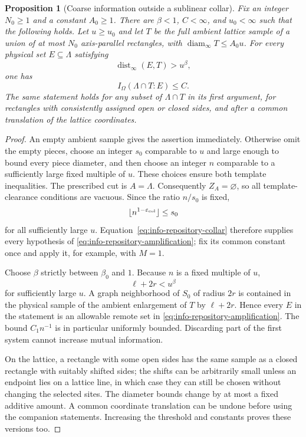 \documentclass[11pt]{article}
\numberwithin{equation}{section}
\newtheorem{proposition}[theorem]{Proposition}
\theoremstyle{definition}
\theoremstyle{remark}
\begin{document}
\begin{proposition}[Coarse information outside a sublinear collar]
\label{prop:coarse}
Fix an integer $N_0\ge1$ and a constant $A_0\ge1$.  There are
$\beta<1$, $C<\infty$, and $u_0<\infty$ such that the following holds.
Let $u\ge u_0$ and let $T$ be the full ambient lattice sample of a union
of at most $N_0$ axis-parallel rectangles, with
$\operatorname{diam}_\infty T\le A_0u$.  For every physical set $E\subseteq\Lambda$
satisfying
\[
 \operatorname{dist}_\infty(E,T)>u^\beta,
\]
one has
\[
 I_\Omega(\Lambda\cap T:E)\le C.
\]
The same statement holds for any subset of $\Lambda\cap T$ in its first
argument, for rectangles with consistently assigned open or closed
sides, and after a common translation of the lattice coordinates.
\end{proposition}

\begin{proof}
An empty ambient sample gives the assertion immediately.  Otherwise
omit the empty pieces, choose an integer $s_0$ comparable to $u$ and
large enough to bound every piece diameter, and then choose an integer
$n$ comparable to a sufficiently large fixed multiple of $u$.  These
choices ensure both template inequalities.  The prescribed cut is
$A=\Lambda$.  Consequently $Z_A=\varnothing$, so all template-clearance
conditions are vacuous.  Since the ratio $n/s_0$ is fixed,
\[
 \lfloor n^{1-\varepsilon_{\rm col}}\rfloor\le s_0
\]
for all sufficiently large $u$.  Equation~\eqref{eq:info-repository-collar}
therefore supplies every hypothesis of
\eqref{eq:info-repository-amplification}; fix its common constant once
and apply it, for example, with $M=1$.

Choose $\beta$ strictly between $\beta_0$ and $1$.  Because $n$ is a
fixed multiple of $u$,
\[
 \ell+2r<u^\beta
\]
for sufficiently large $u$.  A graph neighborhood of $S_0$ of radius
$2r$ is contained in the physical sample of the ambient enlargement of
$T$ by $\ell+2r$.  Hence every $E$ in the statement is an allowable
remote set in \eqref{eq:info-repository-amplification}.  The bound
$C_1n^{-1}$ is in particular uniformly bounded.  Discarding part of the
first system cannot increase mutual information.

On the lattice, a rectangle with some open sides has the same sample
as a closed rectangle with suitably shifted sides; the shifts can be
arbitrarily small unless an endpoint lies on a lattice line, in which
case they can still be chosen without changing the selected sites.
The diameter bounds change by at most a fixed additive amount.  A
common coordinate translation can be undone before using the companion
statements.  Increasing the threshold and constants proves these
versions too.
\end{proof}
\end{document}
